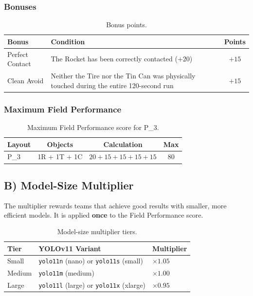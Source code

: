 \documentclass[a4]{article}
\begin{document}
\subsubsection*{Bonuses}

\begin{table}[H]
\centering
\begin{tabular}{p{4cm}p{7cm}c}
\toprule
\textbf{Bonus} & \textbf{Condition} & \textbf{Points} \\
\midrule
Perfect Contact & The Rocket has been correctly contacted ($+20$) & $+15$ \\
Clean Avoid & Neither the Tire nor the Tin Can was physically touched during the entire 120-second run & $+15$ \\
\bottomrule
\end{tabular}
\caption{Bonus points.}
\end{table}

\subsubsection*{Maximum Field Performance}

\begin{table}[H]
\centering
\begin{tabular}{lccc}
\toprule
\textbf{Layout} & \textbf{Objects} & \textbf{Calculation} & \textbf{Max} \\
\midrule
P\_3 & 1R + 1T + 1C & $20 + 15 + 15 + 15 + 15$ & 80 \\
\bottomrule
\end{tabular}
\caption{Maximum Field Performance score for P\_3.}
\end{table}

\subsection*{B) Model-Size Multiplier}

The multiplier rewards teams that achieve good results with smaller, more efficient models. It is applied \textbf{once} to the Field Performance score.

\begin{table}[H]
\centering
\begin{tabular}{lll}
\toprule
\textbf{Tier} & \textbf{YOLOv11 Variant} & \textbf{Multiplier} \\
\midrule
Small & \texttt{yolo11n} (nano) or \texttt{yolo11s} (small) & $\times 1.05$ \\
Medium & \texttt{yolo11m} (medium) & $\times 1.00$ \\
Large & \texttt{yolo11l} (large) or \texttt{yolo11x} (xlarge) & $\times 0.95$ \\
\bottomrule
\end{tabular}
\caption{Model-size multiplier tiers.}
\end{table}
\end{document}
